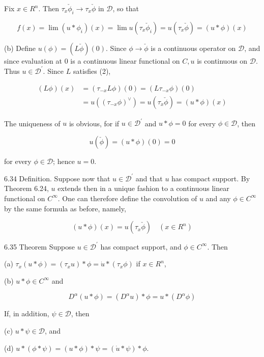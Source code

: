 \documentclass[10pt]{article}
\begin{document}
Fix $x \in R^{n}$. Then $\tau_{x} \check{\phi}_{i} \rightarrow \tau_{x} \check{\phi}$ in $\mathscr{D}$, so that

$$
f(x)=\lim \left(u * \phi_{i}\right)(x)=\lim u\left(\tau_{x} \check{\phi}_{i}\right)=u\left(\tau_{x} \check{\phi}\right)=(u * \phi)(x)
$$

(b) Define $u(\phi)=(L \check{\phi})(0)$. Since $\phi \rightarrow \check{\phi}$ is a continuous operator on $\mathscr{D}$, and since evaluation at 0 is a continuous linear functional on $C, u$ is continuous on $\mathscr{D}$. Thus $u \in \mathscr{D}^{\prime}$. Since $L$ satisfies (2),

$$
\begin{aligned}
(L \phi)(x) & =\left(\tau_{-x} L \phi\right)(0)=\left(L \tau_{-x} \phi\right)(0) \\
& =u\left(\left(\tau_{-x} \phi\right)^{\vee}\right)=u\left(\tau_{x} \check{\phi}\right)=(u * \phi)(x)
\end{aligned}
$$

The uniqueness of $u$ is obvious, for if $u \in \mathscr{D}^{\prime}$ and $u * \phi=0$ for every $\phi \in \mathscr{D}$, then

$$
u(\check{\phi})=(u * \phi)(0)=0
$$

for every $\phi \in \mathscr{D}$; hence $u=0$.

6.34 Definition. Suppose now that $u \in \mathscr{D}^{\prime}$ and that $u$ has compact support. By Theorem 6.24, $u$ extends then in a unique fashion to a continuous linear functional on $C^{\infty}$. One can therefore define the convolution of $u$ and any $\phi \in C^{\infty}$ by the same formula as before, namely,

$$
(u * \phi)(x)=u\left(\tau_{x} \check{\phi}\right) \quad\left(x \in R^{n}\right)
$$

6.35 Theorem Suppose $u \in \mathscr{D}^{\prime}$ has compact support, and $\phi \in C^{\infty}$. Then

(a) $\tau_{x}(u * \phi)=\left(\tau_{x} u\right) * \phi=\dot{u} *\left(\tau_{x} \phi\right)$ if $x \in R^{n}$,

(b) $u * \phi \in C^{\infty}$ and

$$
D^{\alpha}(u * \phi)=\left(D^{\alpha} u\right) * \phi=u *\left(D^{\alpha} \phi\right)
$$

If, in addition, $\psi \in \mathscr{D}$, then

(c) $u * \psi \in \mathscr{D}$, and

(d) $u *(\phi * \psi)=(u * \phi) * \psi=(\dot{u} * \psi) * \phi$.
\end{document}
